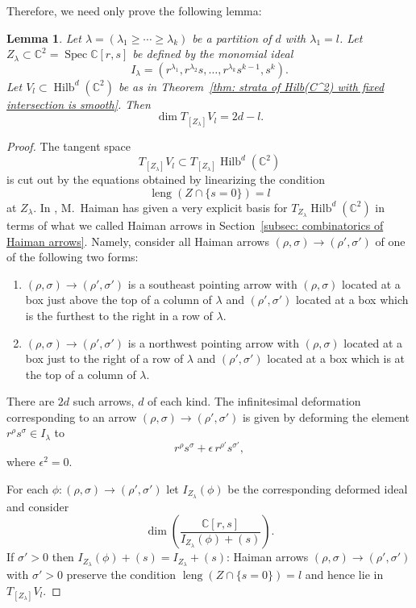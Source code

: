 \documentclass[12pt]{amsart}
\newtheorem{lemma}[theorem]{Lemma}
\theoremstyle{definition}
\newcommand{\CC} {\mathbb{C}}          %
\newcommand{\Hilb}{\operatorname{Hilb}}
\newcommand{\Spec}{\operatorname{Spec}}
\newcommand{\length}{\operatorname{leng}}
\begin{document}
Therefore, we need only prove the following lemma:
\begin{lemma}\label{lem: dim of Vl at Zlambda is 2d-l}
Let $\lambda =(\lambda_{1}\geq \dotsb \geq \lambda_{k})$ be a
partition of $d$ with $\lambda_{1}=l$. Let $Z_{\lambda}\subset
\CC^{2}=\Spec \CC [r,s]$ be defined by the monomial ideal
\[
I_{\lambda} = (r^{\lambda_{1}},r^{\lambda_{2}}s,\dotsc ,r^{\lambda_{k}}s^{k-1},s^{k}).
\]
Let $V_{l}\subset \Hilb^{d}(\CC^{2})$ be as in Theorem~\ref{thm:
strata of Hilb(C^2) with fixed intersection is smooth}. Then
\[
\dim T_{[Z_{\lambda}]}V_{l} = 2d-l.
\]
\end{lemma}
\begin{proof}
The tangent space
\[
T_{[Z_{\lambda}]}V_{l} \subset T_{[Z_{\lambda}]} \Hilb^{d}(\CC^{2})
\]
is cut out by the equations obtained by linearizing the condition
\[
\length (Z\cap \{s=0 \})=l
\]
at $Z_{\lambda}$. In
\cite{Haiman1998}, M.~Haiman has given a very explicit basis for
$T_{Z_{\lambda}}\Hilb^{d}(\CC^{2})$ in terms of what we called Haiman
arrows in Section~\ref{subsec: combinatorics of Haiman
arrows}. Namely, consider all Haiman arrows $(\rho ,\sigma )\to (\rho
',\sigma ')$ of one of the following two forms:
\begin{enumerate}
\item  $(\rho ,\sigma )\to (\rho ',\sigma ')$ is a southeast
pointing arrow with $(\rho ,\sigma )$ located at a box just above the
top of a column of $\lambda$ and $(\rho ',\sigma ')$ located at a box
which is the furthest to the right in a row of $\lambda$.
\item  $(\rho ,\sigma )\to (\rho ',\sigma ')$ is a northwest
pointing arrow with $(\rho ,\sigma )$ located at a box just to the
right of a row of $\lambda$ and  $(\rho ',\sigma ')$ located at a box
which is at the top of a column of $\lambda$.
\end{enumerate}
There are $2d$ such arrows, $d$ of each kind. The infinitesimal
deformation corresponding to an arrow $(\rho ,\sigma )\to (\rho
',\sigma ')$ is given by deforming the element $r^{\rho}s^{\sigma}\in
I_{\lambda}$ to
\[
r^{\rho}s^{\sigma}+\epsilon \, r^{\rho '}s^{\sigma '},
\]
where $\epsilon^{2}=0$.

For each $\phi :(\rho ,\sigma )\to (\rho ',\sigma ')$ let
$I_{Z_{\lambda}}(\phi )$ be the corresponding deformed ideal and
consider
\[
\dim \left(\frac{\CC [r,s] }{I_{Z_{\lambda}}(\phi) + (s)} \right).
\]
If $\sigma '>0$ then $I_{Z_{\lambda}}(\phi ) + (s) =
I_{Z_{\lambda}} + (s)$: Haiman arrows $(\rho ,\sigma )\to (\rho
',\sigma ')$ with $\sigma '>0$ preserve the condition $\length (Z\cap
\{s=0 \})=l$ and hence lie in $T_{[Z_{\lambda}]}V_{l}$.


\end{proof}
\end{document}

